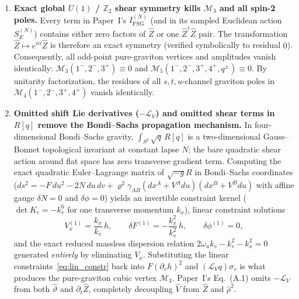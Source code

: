 \documentclass[11pt]{article}
\newcommand{\calM}{\mathcal{M}}
\begin{document}
\begin{enumerate}
\item \textbf{Exact global $U(1)$ / $\mathbb{Z}_2$ shear symmetry kills $\calM_3$ and all spin-2 poles.} Every term in Paper~I's $I_{\mathrm{FSG}}^{(N)}$ (and in its sampled Euclidean action $S_E^{(N)}$) contains either zero factors of $\widehat{Z}$ or one $\widehat{Z}^\dagger\widehat{Z}$ pair. The transformation $\widehat{Z} \mapsto e^{i\alpha}\widehat{Z}$ is therefore an exact symmetry (verified symbolically to residual $0$). Consequently, all odd-point pure-graviton vertices and amplitudes vanish identically: $\calM_3(1^-,2^-,3^+) \equiv 0$ and $\calM_5(1^-,2^-,3^+,4^+,q^\pm) \equiv 0$. By unitarity factorization, the residues of all $s,t,u$-channel graviton poles in $\calM_4(1^-,2^-,3^+,4^+)$ vanish identically.

\item \textbf{Omitted shift Lie derivatives ($-\mathcal{L}_V$) and omitted shear terms in $R[q]$ remove the Bondi--Sachs propagation mechanism.} In four-dimensional Bondi--Sachs gravity, $\int_{S^2}\sqrt{q}\,R[q]$ is a two-dimensional Gauss--Bonnet topological invariant at constant lapse $N$; the bare quadratic shear action around flat space has zero transverse gradient term. Computing the exact quadratic Euler--Lagrange matrix of $\sqrt{-g}R$ in Bondi--Sachs coordinates ($ds^2 = -F\,du^2 - 2N\,du\,dv + \varrho^2\gamma_{AB}(dx^A + V^A du)(dx^B + V^B du)$ with affine gauge $\delta N = 0$ and $\delta\phi = 0$) yields an invertible constraint kernel ($\det K_c = -k_v^6$ for one transverse momentum $k_x$), linear constraint solutions
\begin{equation}\label{eq:lin_constr}
V_x^{(1)} = \frac{k_x}{k_v}\,h, \qquad \delta F^{(1)} = -\frac{k_x^2}{k_v^2}\,h, \qquad \delta\phi^{(1)} = 0,
\end{equation}
and the exact reduced massless dispersion relation $2\omega_u k_v - k_v^2 - k_x^2 = 0$ generated \emph{entirely} by eliminating $V_x$. Substituting the linear constraints~\eqref{eq:lin_constr} back into $F(\partial_v h)^2$ and $(\mathcal{L}_V q)\sigma_v$ is what produces the pure-graviton cubic vertex $\calM_3$. Paper~I's Eq.~(A.1) omits $-\mathcal{L}_V$ from both $\widehat{\vartheta}$ and $\partial_t\widehat{Z}$, completely decoupling $\widehat{V}$ from $\widehat{Z}$ and $\widehat{\rho}^2$.


\end{enumerate}
\end{document}
